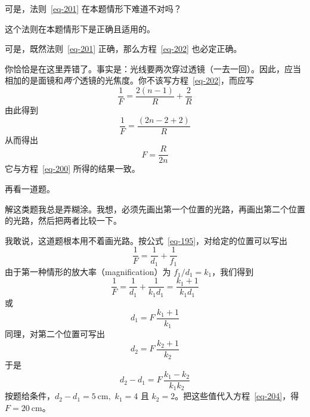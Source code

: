 \begin{dialogue}
\stdb 可是，法则~\eqref{eq-201} 在本题情形下难道不对吗？

\tchr 这个法则在本题情形下是正确且适用的。

\stdb 可是，既然法则~\eqref{eq-201} 正确，那么方程~\eqref{eq-202} 也必定正确。

\tchr 你恰恰是在这里弄错了。事实是：光线要两次穿过透镜（一去一回）。因此，应当相加的是面镜和\emph{两个}透镜的光焦度。你不该写方程~\eqref{eq-202}，而应写
\begin{equation*}
\frac{1}{F} = \frac{2(n-1)}{R} + \frac{2}{R}
\end{equation*}
由此得到
\begin{equation*}
\frac{1}{F} = \frac{(2n-2+2)}{R}
\end{equation*}
从而得出
\begin{equation*}
F = \frac{R}{2n}
\end{equation*}
它与方程~\eqref{eq-200} 所得的结果一致。

再看一道题。

\stda 解这类题我总是弄糊涂。我想，必须先画出第一个位置的光路，再画出第二个位置的光路，然后把两者比较一下。

\tchr 我敢说，这道题根本用不着画光路。按公式~\eqref{eq-195}，对给定的位置可以写出
\begin{equation*}%
\frac{1}{F} = \frac{1}{d_{1}} + \frac{1}{f_{1}}
\end{equation*}
 由于第一种情形的放大率（magnification）为 $f_{1}/d_{1} = k_{1}$，我们得到
\begin{equation*}%
\frac{1}{F} = \frac{1}{d_{1}} + \frac{1}{k_{1}d_{1}} = \frac{k_{1}+1}{k_{1}d_{1}}
\end{equation*}
 或
\begin{equation*}%
d_{1} = F \, \frac{k_{1}+1}{k_{1}}
\end{equation*}
同理，对第二个位置可写出
\begin{equation*}%
d_{2} = F \, \frac{k_{2}+1}{k_{2}}
\end{equation*}
于是
\begin{equation}%
d_{2} - d_{1} = F \, \frac{k_{1}-k_{2}}{k_{1}k_{2}}
\label{eq-204}
\end{equation}
按题给条件，$d_{2} - d_{1} = \SI{5}{\centi\metre}, \,\, k_{1}=4 \,\, \text{且} \,\, k_{2} = 2$。把这些值代入方程~\eqref{eq-204}，得 $F = \SI{20}{\centi\metre}$。


\end{dialogue}

